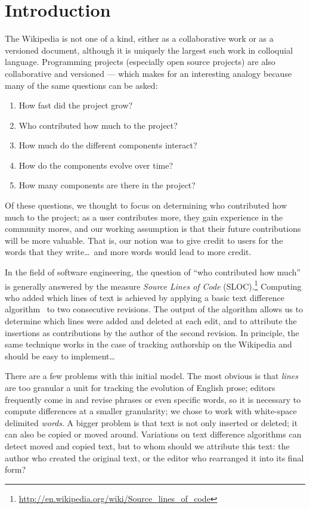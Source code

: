 
\section{Introduction}
\label{sec:diff-intro}

The Wikipedia is not one of a kind, either as a collaborative work or as
a versioned document, although it is uniquely the largest such work
in colloquial language.
Programming projects (especially open source projects)
are also collaborative and versioned --- which makes for
an interesting analogy because many of the same questions can be asked:
\begin{enumerate}
\item How fast did the project grow?
\item Who contributed how much to the project?
\item How much do the different components interact?
\item How do the components evolve over time?
\item How many components are there in the project?
\end{enumerate}
Of these questions, we thought to focus on determining who contributed
how much to the project; as a user contributes more, they gain experience
in the community mores, and our working assumption is that their future
contributions will be more valuable.
That is, our notion was to give credit to users for the words that
they write\ldots\ and more words would lead to more credit.

In the field of software engineering, the question of ``who contributed
how much'' is generally answered by the measure
\textit{Source Lines of Code} (SLOC).\footnote{\url{http://en.wikipedia.org/wiki/Source_lines_of_code}}
Computing who added which lines of text is achieved
by applying a basic text difference
algorithm~\cite{Myers1986,Tichy1984,Burns1997} to two consecutive
revisions.
The output of the algorithm allows us to determine which lines were added and
deleted at each edit, and to attribute the insertions as contributions by the
author of the second revision.
In principle, the same technique works in the case of tracking authorship
on the Wikipedia and should be easy to implement\ldots

There are a few problems with this initial model.
The most obvious is that \textit{lines} are too granular
a unit for tracking the evolution of English prose;
editors frequently come in and revise phrases or
even specific words, so it is necessary to compute
differences at a smaller granularity;
we chose to work with white-space delimited \textit{words}.
A bigger problem is that text is not only inserted
or deleted; it can also be copied or moved around.
Variations on text difference algorithms can
detect moved and copied text, but to whom should we attribute this text:
the author who created the original text, or the editor who rearranged it
into its final form?


